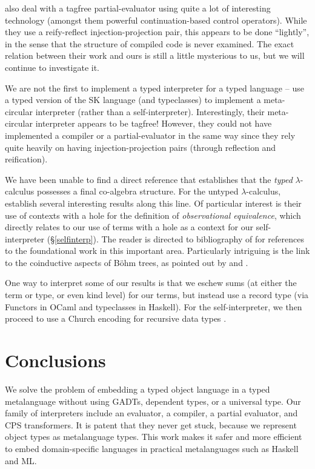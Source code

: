 \documentclass[preprint]{sigplanconf}
\begin{document}
\citet{fiore:nbe-ppdp2002,balat:tdpe-popl2004} also deal with a 
tagfree partial-evaluator using quite a lot of interesting 
technology (amongst them powerful continuation-based control operators).
While they use a reify-reflect injection-projection pair, this appears
to be done ``lightly'', in the sense that the structure of compiled code
is never examined.  The exact relation between their work and ours is 
still a little mysterious to us, but we will continue to investigate it.

We are not the first to implement a typed interpreter for a typed
language -- \citet{laod93} use a typed version of the SK language
(and typeclasses) to implement a meta-circular interpreter (rather than
a self-interpreter).  Interestingly, their meta-circular interpreter
appears to be tagfree!  However, they could not have implemented a
compiler or a partial-evaluator in the same way since they rely quite
heavily on having injection-projection pairs (through reflection and
reification).  

We have been unable to find a direct reference that establishes that
the \emph{typed} $\lambda$-calculus possesses a final co-algebra structure.
For the untyped $\lambda$-calculus, 
\citet{HonsellLenisa,honsell99coinductive} establish several interesting
results along this line.  Of particular interest is their use of
contexts with a hole \citep[p.13]{honsell99coinductive} for the definition
of \emph{observational equivalence}, which directly relates to our
use of terms with a hole as a context for our self-interpreter 
(\S\ref{selfinterp}).  The reader is directed to bibliography of
\citet{honsell99coinductive} for references to the foundational work
in this important area.  Particularly intriguing is the link to the
coinductive aspects of B\"{o}hm trees, as pointed out by
\citet{berarducci-models} and \citet[Example 4.3.4]{jacobs-coalgebra}.

One way to interpret some of our results is that we eschew sums (at either the
term or type, or even kind level) for our terms, but instead use a record type 
(via Functors in OCaml and typeclasses in Haskell).
For the self-interpreter, we then proceed to use a Church encoding for
recursive data types \citep{bohm-automatic}.

\section{Conclusions}\label{conclusion}

We solve the problem of embedding a typed object language in a typed
metalanguage without using GADTs, dependent types, or a universal type.
Our family of interpreters include an evaluator, a compiler, a partial
evaluator, and CPS transformers.  It is patent that they never get stuck,
because we represent object types as metalanguage types.  This work
makes it safer and more efficient to embed domain\hyp specific languages
in practical metalanguages such as Haskell and ML\@.
\end{document}
